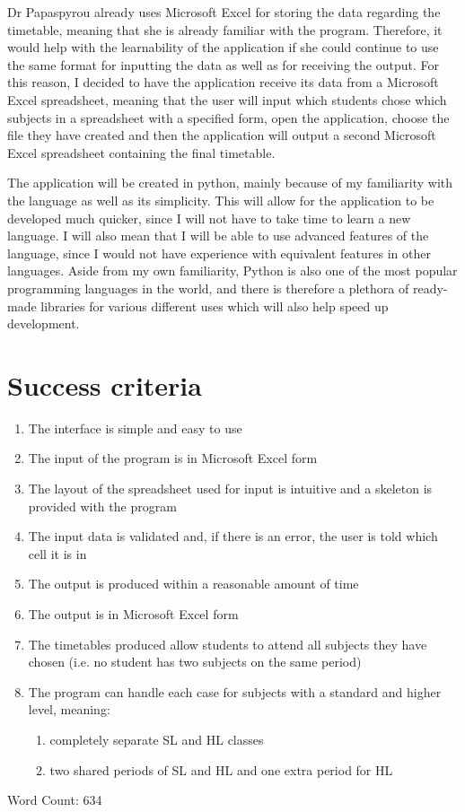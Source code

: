 \documentclass[a4paper, 12pt]{article}
\begin{document}
Dr Papaspyrou already uses Microsoft Excel for storing the data regarding the timetable,
meaning that she is already familiar with the program. Therefore, it would help with the
learnability of the application if she could continue to use the same format for inputting
the data as well as for receiving the output. For this reason, I decided to have the
application receive its data from a Microsoft Excel spreadsheet, meaning that the user will
input which students chose which subjects in a spreadsheet with a specified form, open the
application, choose the file they have created and then the application will output a second
Microsoft Excel spreadsheet containing the final timetable.

The application will be created in python, mainly because of my familiarity with the
language as well as its simplicity. This will allow for the application to be developed much
quicker, since I will not have to take time to learn a new language. I will also mean that I
will be able to use advanced features of the language, since I would not have experience
with equivalent features in other languages. Aside from my own familiarity, Python is also
one of the most popular programming languages in the world, and there is therefore a
plethora of ready-made libraries for various different uses which will also help speed up
development. 

\section{Success criteria}

\begin{enumerate}
    \item The interface is simple and easy to use
    \item The input of the program is in Microsoft Excel form
    \item The layout of the spreadsheet used for input is intuitive and a skeleton is
        provided with the program
    \item The input data is validated and, if there is an error, the user is told which cell
        it is in
    \item The output is produced within a reasonable amount of time
    \item The output is in Microsoft Excel form
    \item The timetables produced allow students to attend all subjects they have chosen
        (i.e. no student has two subjects on the same period)
    \item The program can handle each case for subjects with a standard and higher level, 
        meaning:
        \begin{enumerate}
            \item completely separate SL and HL classes
            \item two shared periods of SL and HL and one extra period for HL
        \end{enumerate}
\end{enumerate}

Word Count: 634
\end{document}
